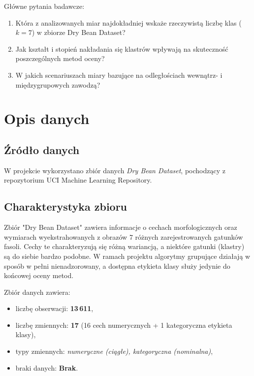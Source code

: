 \documentclass[11pt,a4paper]{article}
\begin{document}
Główne pytania badawcze:
\begin{enumerate}[leftmargin=1.5cm]
    \item Która z analizowanych miar najdokładniej wskaże rzeczywistą liczbę klas ($k=7$) w zbiorze Dry Bean Dataset?
    \item Jak kształt i stopień nakładania się klastrów wpływają na skuteczność poszczególnych metod oceny?
    \item W jakich scenariuszach miary bazujące na odległościach wewnątrz- i międzygrupowych zawodzą?
\end{enumerate}

\section{Opis danych}

\subsection{Źródło danych}

W projekcie wykorzystano zbiór danych \textit{Dry Bean Dataset}, pochodzący z repozytorium UCI Machine Learning Repository.

\subsection{Charakterystyka zbioru}

Zbiór "Dry Bean Dataset" zawiera informacje o cechach morfologicznych oraz wymiarach wyekstrahowanych z obrazów 7 różnych zarejestrowanych gatunków fasoli. Cechy te charakteryzują się różną wariancją, a niektóre gatunki (klastry) są do siebie bardzo podobne.
W ramach projektu algorytmy grupujące działają w sposób w pełni nienadzorowany, a dostępna etykieta klasy służy jedynie do końcowej oceny metod.

Zbiór danych zawiera:
\begin{itemize}[leftmargin=1.5cm]
    \item liczbę obserwacji: \textbf{13\,611},
    \item liczbę zmiennych: \textbf{17} (16 cech numerycznych + 1 kategoryczna etykieta klasy),
    \item typy zmiennych: \textit{numeryczne (ciągłe), kategoryczna (nominalna)},
    \item braki danych: \textbf{Brak}.
\end{itemize}
\end{document}
